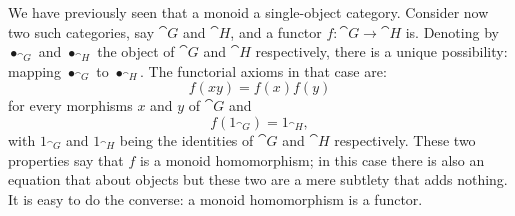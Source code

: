 \begin{example}
We have previously seen that a monoid  a single-object category. Consider now two such categories, say \(\cat G\) and \(\cat H\), and a functor \(f : \cat G \to \cat H\) is. Denoting by \(\bullet_{\cat G}\) and \(\bullet_{\cat H}\) the object of \(\cat G\) and \(\cat H\) respectively, there is a unique possibility: mapping \(\bullet_{\cat G}\) to \(\bullet_{\cat H}\). The functorial axioms in that case are:
\[f(xy) = f(x)f(y)\]
for every morphisms \(x\) and \(y\) of \(\cat G\) and
\[f(1_{\cat G}) = 1_{\cat H} ,\]
with \(1_{\cat G}\) and \(1_{\cat H}\) being the identities of \(\cat G\) and \(\cat H\) respectively. These two properties say that \(f\) is a monoid homomorphism; in this case there is also an equation that about objects but these two are a mere subtlety that adds nothing. It is easy to do the converse: a monoid homomorphism is a functor.
\end{example}

